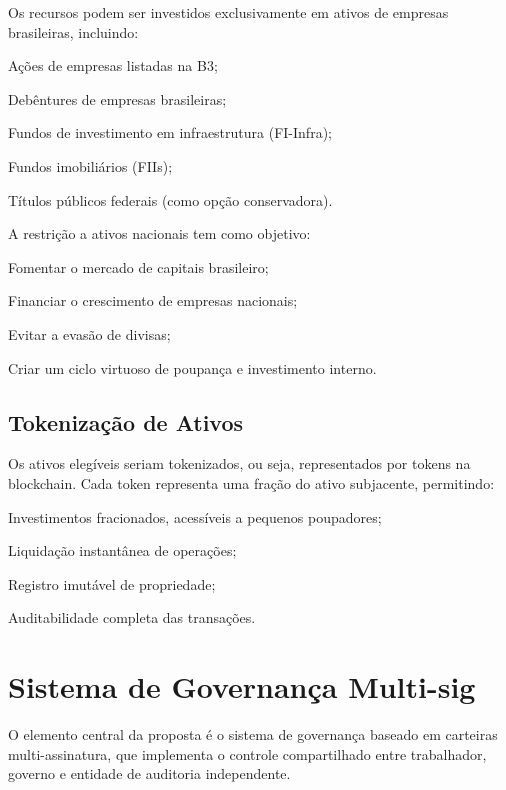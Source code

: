 Os recursos podem ser investidos exclusivamente em ativos de empresas brasileiras, incluindo:

\begin{alineas}
    \item Ações de empresas listadas na B3;
    \item Debêntures de empresas brasileiras;
    \item Fundos de investimento em infraestrutura (FI-Infra);
    \item Fundos imobiliários (FIIs);
    \item Títulos públicos federais (como opção conservadora).
\end{alineas}

A restrição a ativos nacionais tem como objetivo:
\begin{alineas}
    \item Fomentar o mercado de capitais brasileiro;
    \item Financiar o crescimento de empresas nacionais;
    \item Evitar a evasão de divisas;
    \item Criar um ciclo virtuoso de poupança e investimento interno.
\end{alineas}

\subsection{Tokenização de Ativos}

Os ativos elegíveis seriam tokenizados, ou seja, representados por tokens na blockchain. Cada token representa uma fração do ativo subjacente, permitindo:

\begin{alineas}
    \item Investimentos fracionados, acessíveis a pequenos poupadores;
    \item Liquidação instantânea de operações;
    \item Registro imutável de propriedade;
    \item Auditabilidade completa das transações.
\end{alineas}

\section{Sistema de Governança Multi-sig}

O elemento central da proposta é o sistema de governança baseado em carteiras multi-assinatura, que implementa o controle compartilhado entre trabalhador, governo e entidade de auditoria independente.

